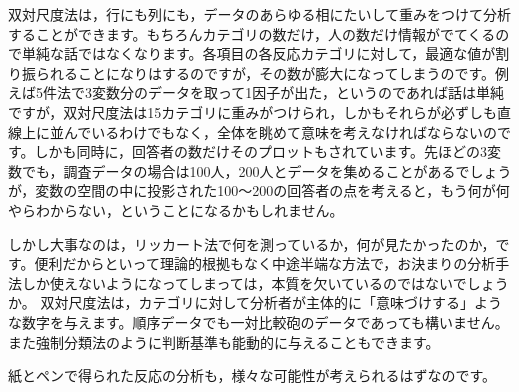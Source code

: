 \documentclass{ltjsbook}
\begin{document}
双対尺度法は，行にも列にも，データのあらゆる相にたいして重みをつけて分析することができます。もちろんカテゴリの数だけ，人の数だけ情報がでてくるので単純な話ではなくなります。各項目の各反応カテゴリに対して，最適な値が割り振られることになりはするのですが，その数が膨大になってしまうのです。例えば5件法で3変数分のデータを取って1因子が出た，というのであれば話は単純ですが，双対尺度法は15カテゴリに重みがつけられ，しかもそれらが必ずしも直線上に並んでいるわけでもなく，全体を眺めて意味を考えなければならないのです。しかも同時に，回答者の数だけそのプロットもされています。先ほどの3変数でも，調査データの場合は100人，200人とデータを集めることがあるでしょうが，変数の空間の中に投影された100〜200の回答者の点を考えると，もう何が何やらわからない，ということになるかもしれません。

しかし大事なのは，リッカート法で何を測っているか，何が見たかったのか，です。便利だからといって理論的根拠もなく中途半端な方法で，お決まりの分析手法しか使えないようになってしまっては，本質を欠いているのではないでしょうか。
双対尺度法は，カテゴリに対して分析者が主体的に「意味づけする」ような数字を与えます。順序データでも一対比較砲のデータであっても構いません。また強制分類法のように判断基準も能動的に与えることもできます。

紙とペンで得られた反応の分析も，様々な可能性が考えられるはずなのです。
\end{document}
